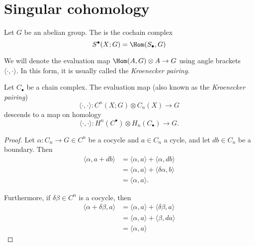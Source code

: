 \documentclass[main.tex]{subfiles}
\begin{document}
\section{Singular cohomology}
\label{sec:singular_cohomology}

\begin{definition}
  \label{def:singular_cohomology}
  Let $G$ be an abelian group. The  is the cochain complex
  \begin{equation*}
    S^{\bullet}(X; G) = \Hom(S_{\bullet}, G)
  \end{equation*}
\end{definition}

We will denote the evaluation map $\Hom(A, G) \otimes A \to G$ using angle brackets $\langle \cdot,\cdot \rangle$. In this form, it is usually called the \emph{Kroenecker pairing.}

\begin{lemma}
  \label{lemma:kroenecker_pairing_descends_to_homology}
  Let $C_{\bullet}$ be a chain complex. The evaluation map (also known as the \emph{Kroenecker pairing})
  \begin{equation*}
    \langle \cdot,\cdot \rangle\colon C^{n}(X; G) \otimes C_{n}(X) \to G
  \end{equation*}
  descends to a map on homology
  \begin{equation*}
    \langle \cdot,\cdot \rangle\colon H^{n}(C^{\bullet}) \otimes H_{n}(C_{\bullet}) \to G.
  \end{equation*}
\end{lemma}
\begin{proof}
  Let $\alpha\colon C_{n} \to G \in C^{n}$ be a cocycle and $a \in C_{n}$ a cycle, and let $d b \in C_{n}$ be a boundary. Then
  \begin{align*}
    \langle \alpha, a + db \rangle &= \langle \alpha, a \rangle + \langle \alpha, db \rangle \\
    &= \langle \alpha, a \rangle + \langle \delta \alpha, b \rangle \\
    &= \langle \alpha, a \rangle.
  \end{align*}

  Furthermore, if $\delta \beta \in C^{n}$ is a cocycle, then
  \begin{align*}
    \langle \alpha + \delta \beta, a \rangle &= \langle \alpha, a \rangle + \langle \delta \beta, a \rangle \\
    &= \langle \alpha, a \rangle + \langle \beta, d a \rangle \\
    &= \langle \alpha, a \rangle
  \end{align*}
\end{proof}
\end{document}
